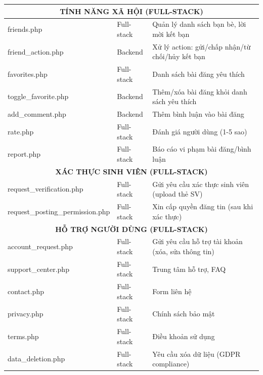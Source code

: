 \documentclass[a4paper,12pt]{article}
\begin{document}
\begin{longtable}{|p{4.5cm}|p{2cm}|p{8cm}|}
\multicolumn{3}{|c|}{\textbf{TÍNH NĂNG XÃ HỘI (FULL-STACK)}} \\
\hline
friends.php & Full-stack & Quản lý danh sách bạn bè, lời mời kết bạn \\
\hline
friend\_action.php & Backend & Xử lý action: gửi/chấp nhận/từ chối/hủy kết bạn \\
\hline
favorites.php & Full-stack & Danh sách bài đăng yêu thích \\
\hline
toggle\_favorite.php & Backend & Thêm/xóa bài đăng khỏi danh sách yêu thích \\
\hline
add\_comment.php & Backend & Thêm bình luận vào bài đăng \\
\hline
rate.php & Full-stack & Đánh giá người dùng (1-5 sao) \\
\hline
report.php & Full-stack & Báo cáo vi phạm bài đăng/bình luận \\
\hline

\multicolumn{3}{|c|}{\textbf{XÁC THỰC SINH VIÊN (FULL-STACK)}} \\
\hline
request\_verification.php & Full-stack & Gửi yêu cầu xác thực sinh viên (upload thẻ SV) \\
\hline
request\_posting\_permission.php & Full-stack & Xin cấp quyền đăng tin (sau khi xác thực) \\
\hline

\multicolumn{3}{|c|}{\textbf{HỖ TRỢ NGƯỜI DÙNG (FULL-STACK)}} \\
\hline
account\_request.php & Full-stack & Gửi yêu cầu hỗ trợ tài khoản (xóa, sửa thông tin) \\
\hline
support\_center.php & Full-stack & Trung tâm hỗ trợ, FAQ \\
\hline
contact.php & Full-stack & Form liên hệ \\
\hline
privacy.php & Full-stack & Chính sách bảo mật \\
\hline
terms.php & Full-stack & Điều khoản sử dụng \\
\hline
data\_deletion.php & Full-stack & Yêu cầu xóa dữ liệu (GDPR compliance) \\
\hline


\end{longtable}
\end{document}
